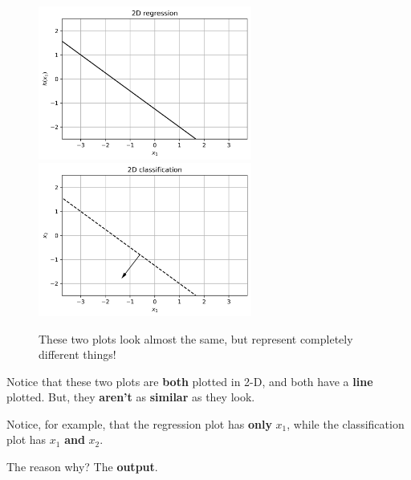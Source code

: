         \begin{figure}[H]

            
            \includegraphics[width=70mm,scale=0.5]{images/classification_images/2d_regression_versus.png}
            \includegraphics[width=70mm,scale=0.5]{images/classification_images/2d_classification_versus.png}

            \caption*{These two plots look almost the same, but represent completely different things!}
        \end{figure}
        
        Notice that these two plots are \textbf{both} plotted in 2-D, and both have a \textbf{line} plotted. But, they \textbf{aren't} as \textbf{similar} as they look. 
        
        Notice, for example, that the regression plot has \textbf{only} $x_1$, while the classification plot has $x_1$ \textbf{and} $x_2$.
        
        The reason why? The \textbf{output}.
        
